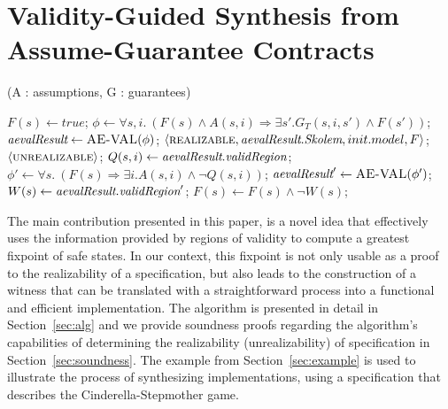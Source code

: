 \section{Validity-Guided Synthesis from Assume-Guarantee Contracts}
\label{sec:synthesis}

\begin{algorithm*}[!t]
\caption{\jsynvg (A : assumptions, G : guarantees)}
\label{alg:synthesis}
\begin{algorithmic}[1]
	\State $F(s) \gets true$;
		\State $\phi \gets \forall s,i. \ (F(s) \land A(s,i) \Rightarrow \exists s'.G_{T}(s,i,s') \land F(s'))$;
		\State $\textit{aevalResult} \gets \textsc{AE-VAL}(\phi)$;
		\If{$\isValid(\aevalres)$}
            \If{$\isSat(\init)$}
				\Return $\langle \textsc{realizable}, \textit{aevalResult}.\textit{Skolem}, init.model, F \rangle$;
		 		\Return $\langle \textsc{unrealizable} \rangle$;
		 	\EndIf
			\State $Q(s,i) \gets \textit{aevalResult}.\textit{validRegion}$;
			\State $\phi' \gets \forall s. \ (F(s) \Rightarrow \exists i. A(s,i) \land \lnot
			Q(s,i))$;
			\State $\textit{aevalResult}' \gets \textsc{AE-VAL}(\phi')$;
				\State $W(s) \gets \textit{aevalResult}.\textit{validRegion}'$;
			\State $F(s) \gets F(s) \land \lnot W(s)$;	
			
				
		\EndIf
	\EndWhile
\end{algorithmic}
\end{algorithm*}

The main contribution presented in this paper, is a novel idea that
effectively uses the information provided by regions of validity to
compute a greatest fixpoint of safe states. In our context, this
fixpoint is not only usable as a proof to the realizability of a
specification, but also leads to the construction of a witness that
can be translated with a straightforward process into a functional and
efficient implementation. The algorithm is presented in detail in
Section~\ref{sec:alg} and we provide soundness proofs regarding the
algorithm's capabilities of determining the realizability
(unrealizability) of specification in Section~\ref{sec:soundness}. The
example from Section~\ref{sec:example} is used to illustrate the
process of synthesizing implementations, using a specification that
describes the Cinderella-Stepmother game.

